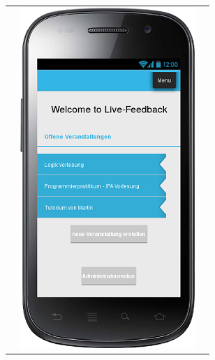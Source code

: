 \documentclass[german,a4paper]{beamer}
\begin{document}
\begin{frame}
\begin{tabular}{ccc}
  &
  \includegraphics[height=0.75\textheight]{./mockups/mockup_welcome_admin.png}
\end{tabular}
\end{frame}
\end{document}

